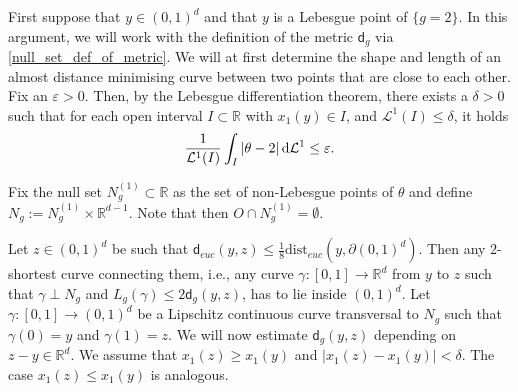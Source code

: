 \documentclass[a4paper,10pt]{article}
\numberwithin{equation}{section}
\newcommand{\R}{\mathbb{R}}
\newcommand{\e}{\varepsilon}
\newcommand{\dist}{\mathrm{dist}}
\newcommand{\sfd}{\mathsf d}
\newcommand{\di}{{\rm d}}
\begin{document}
First suppose that $y \in (0,1)^d$ and that $y$ is a Lebesgue point of $\{g=2\}$. 
In this argument, we will work with the definition of the metric $\sfd_g$ via \eqref{null_set_def_of_metric}. 
We will at first determine the shape and length of an almost distance minimising curve between two points that are close to each other. 
Fix an $\e >0$. Then, by the Lebesgue differentiation theorem, there exists a $\delta > 0$ such that for each open interval $I \subset \R$ with $x_1(y) \in I$, and $\mathcal{L}^1(I) \leq \delta$, it holds
\begin{align}\label{delta:lebesgue_point_condition_ex1/4.2}
    \frac{1}{\mathcal{L}^1(I)}\int_I |\theta-2| \, \di \mathcal{L}^1 \leq \e. 
\end{align}

Fix the null set $N^{(1)}_g \subset \R$ as the set of non-Lebesgue points of $\theta$ and define $N_g := N^{(1)}_g \times \R^{d-1}$. Note that then $O \cap N^{(1)}_g = \emptyset$. 

Let $z \in (0,1)^d$ be such that $\sfd_{euc}(y, z) \leq \frac{1}{8}\dist_{euc}(y, \partial (0,1)^d)$. Then any $2$-shortest curve connecting them, i.e., any curve $\gamma:[0,1]\to \R^d$ from $y$ to $z$ such that $\gamma \perp N_g$ and $L_g(\gamma) \leq 2 \sfd_g(y, z)$, has to lie inside $(0,1)^d$. Let $\gamma:[0,1]\to (0,1)^d$ be a Lipschitz continuous curve transversal to $N_g$ such that $\gamma(0)=y$ and $\gamma(1)=z$.
We will now estimate $\sfd_g(y,z)$ depending on $z-y \in \R^d$. 
We assume that $x_1(z) \geq x_1(y)$ and $|x_1(z)-x_1(y)| < \delta$. The case $x_1(z) \leq x_1(y)$ is analogous.
\end{document}
